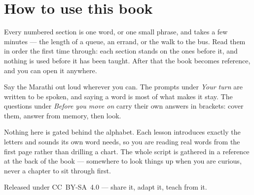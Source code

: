 \documentclass[11pt,twoside]{book}
\begin{document}
\section*{How to use this book}

Every numbered section is one word, or one small phrase, and takes a few
minutes --- the length of a queue, an errand, or the walk to the bus. Read them
in order the first time through: each section stands on the ones before it, and
nothing is used before it has been taught. After that the book becomes
reference, and you can open it anywhere.

Say the Marathi out loud wherever you can. The prompts under \emph{Your turn}
are written to be spoken, and saying a word is most of what makes it stay. The
questions under \emph{Before you move on} carry their own answers in brackets:
cover them, answer from memory, then look.

Nothing here is gated behind the alphabet. Each lesson introduces exactly the
letters and sounds its own word needs, so you are reading real words from the
first page rather than drilling a chart. The whole script is gathered in a
reference at the back of the book --- somewhere to look things up when you are
curious, never a chapter to sit through first.

Released under CC~BY-SA~4.0 --- share it, adapt it, teach from it.

\tableofcontents

\mainmatter
























\backmatter






\end{document}
